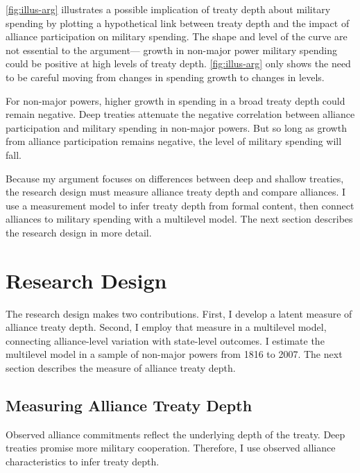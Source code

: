 \documentclass[12pt]{article}
\begin{document}
\autoref{fig:illus-arg} illustrates a possible implication of treaty depth about military spending by plotting a hypothetical link between treaty depth and the impact of alliance participation on military spending. 
The shape and level of the curve are not essential to the argument--- growth in non-major power military spending could be positive at high levels of treaty depth. 
\autoref{fig:illus-arg} only shows the need to be careful moving from changes in spending growth to changes in levels. 


For non-major powers, higher growth in spending in a broad treaty depth could remain negative. 
Deep treaties attenuate the negative correlation between alliance participation and military spending in non-major powers. 
But so long as growth from alliance participation remains negative, the level of military spending will fall. 


Because my argument focuses on differences between deep and shallow treaties, the research design must measure alliance treaty depth and compare alliances.  
I use a measurement model to infer treaty depth from formal content, then connect alliances to military spending with a multilevel model. 
The next section describes the research design in more detail. 



\section{Research Design} 


The research design makes two contributions. 
First, I develop a latent measure of alliance treaty depth. 
Second, I employ that measure in a multilevel model, connecting alliance-level variation with state-level outcomes. 
I estimate the multilevel model in a sample of non-major powers from 1816 to 2007. 
The next section describes the measure of alliance treaty depth. 


\subsection{Measuring Alliance Treaty Depth} 


Observed alliance commitments reflect the underlying depth of the treaty. 
Deep treaties promise more military cooperation. 
Therefore, I use observed alliance characteristics to infer treaty depth.
\end{document}
